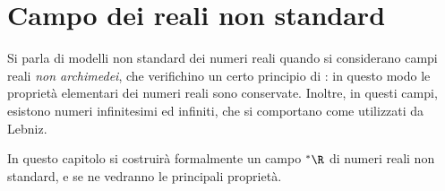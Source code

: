 \chapter{Campo dei reali non standard}

Si parla di modelli non standard dei numeri reali quando si considerano campi reali \emph{non archimedei}, che verifichino un certo principio di : in questo modo le proprietà elementari dei numeri reali sono conservate. Inoltre, in questi campi, esistono numeri infinitesimi ed infiniti, che si comportano come utilizzati da Lebniz. 

In questo capitolo si costruirà formalmente un campo $ ^{*}\R $ di numeri reali non standard, e se ne vedranno le principali proprietà.





    
